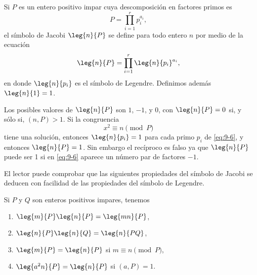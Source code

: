 \documentclass[12pt,a4paper]{book}
\begin{document}
    \begin{definicion}
        Si $P$ es un entero positivo impar cuya descomposición en factores primos es
        \begin{equation*}
            P=\prod_{i=1}^{r}p_{i}^{a_{i}},
        \end{equation*}
        el símbolo de Jacobi $\leg{n}{P}$ se define para todo entero $n$ por medio de la
        ecuación
        \begin{equation}\label{eq:9-6}
            \leg{n}{P}=\prod_{i=1}^{r}\leg{n}{p_{i}}^{a_{i}},
        \end{equation}
        en donde $\leg{n}{p_{i}}$ es el símbolo de Legendre. Definimos además $\leg{n}{1}=1$.
    \end{definicion}

    Los posibles valores de $\leg{n}{P}$ son $1$, $-1$, y $0$, con $\leg{n}{P}=0$ si, y
    sólo si, $(n,P)>1$. Si la congruencia
    \begin{equation*}
        x^{2}\equiv n\pmod{P}
    \end{equation*}
    tiene una solución, entonces $\leg{n}{p_{i}}=1$ para cada primo $p_{i}$ de \eqref{eq:9-6}, y
    entonces $\leg{n}{P}=1$. Sin embargo el recíproco es falso ya que $\leg{n}{P}$ puede ser
    1 si en \eqref{eq:9-6} aparece un número par de factores $-1$.

    El lector puede comprobar que las siguientes propiedades del símbolo de Jacobi se
    deducen con facilidad de las propiedades del símbolo de Legendre.

    \begin{teorema}\label{teo:9-9}
        Si $P$ y $Q$ son enteros positivos impares, tenemos
        \begin{enumerate}
            \item[(a)] $\leg{m}{P}\leg{n}{P}=\leg{mn}{P}$,
            \item[(b)] $\leg{n}{P}\leg{n}{Q}=\leg{n}{PQ}$,
            \item[(c)] $\leg{m}{P}=\leg{n}{P}$ si $m\equiv n\pmod{P}$,
            \item[(d)] $\leg{a^{2}n}{P}=\leg{n}{P}$ si $(a,P)=1$.
        \end{enumerate}
    \end{teorema}
\end{document}
